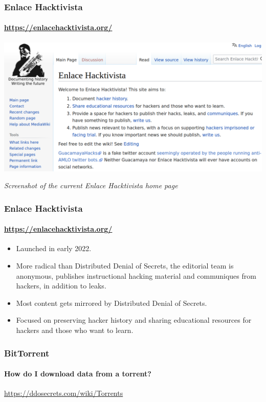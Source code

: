 \documentclass[aspectratio=169,usenames,dvipsnames]{beamer}
\begin{document}
\begin{frame}
  \frametitle{Enlace Hacktivista}
  \framesubtitle{\url{https://enlacehacktivista.org/}}

  \centering
  \includegraphics[width=\textwidth,height=0.6\textheight,keepaspectratio]{img/enlace_hacktivista.png}

  \vfill \footnotesize
  \emph{Screenshot of the current Enlace Hacktivista home page}

\end{frame}

\begin{frame}
  \frametitle{Enlace Hacktivista}
  \framesubtitle{\url{https://enlacehacktivista.org/}}

  \begin{itemize}[<+->]
    \item Launched in early 2022.
    \item More radical than Distributed Denial of Secrets, the editorial team
      is anonymous, publishes instructional hacking material and communiques
      from hackers, in addition to leaks.
    \item Most content gets mirrored by Distributed Denial of Secrets.
    \item Focused on preserving hacker history and sharing educational
      resources for hackers and those who want to learn.
  \end{itemize}

\end{frame}

\begin{frame}
  \frametitle{BitTorrent}
  \framesubtitle{How do I download data from a torrent?}

  \centering
  \LARGE
  \url{https://ddosecrets.com/wiki/Torrents}

\end{frame}
\end{document}
